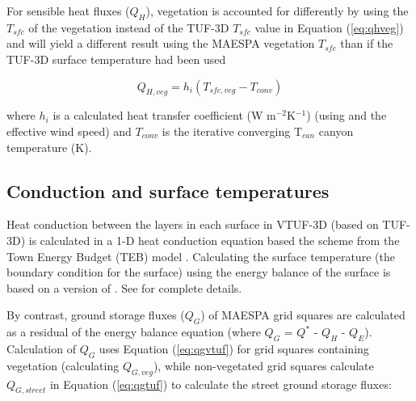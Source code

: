 \documentclass[final,3p,times,authoryear]{elsarticle}
\begin{document}

For sensible heat fluxes ($Q_{H}$), vegetation is accounted for differently by using the $T_{sfc}$ of the vegetation instead of the TUF-3D $T_{sfc}$ value in Equation (\ref{eq:qhveg}) and will yield a different result using the MAESPA vegetation $T_{sfc}$ than if the TUF-3D surface temperature had been used

\begin{equation}\label{eq:qhveg}
 Q_{H,veg} = h_{i}  (T_{sfc,veg}-T_{conv}) 
\end{equation}

where $h_{i}$ is a calculated heat transfer coefficient (W m$^{-2}$K$^{-1}$) (using \cite{Mascart1995} and the effective wind speed) and $T_{conv}$ is the iterative converging T$_{can}$ canyon temperature (K).


\subsection{Conduction and surface temperatures}

Heat conduction between the layers in each surface in VTUF-3D (based on TUF-3D) is calculated in a 1-D heat conduction equation based the scheme from the Town Energy Budget (TEB) model \citep{Masson2000}. Calculating the surface temperature (the boundary condition for the surface) using the energy balance of the surface is based on a version of \cite{Arnfield1990}. See \cite{Krayenhoff2007} for complete details.


By contrast, ground storage fluxes ($Q_{G}$) of MAESPA grid squares are calculated as a residual of the energy balance equation (where $Q_{G}$ = $Q^{*}$ - $Q_{H}$ - $Q_{E}$). Calculation of $Q_{G}$ uses Equation (\ref{eq:qgvtuf}) for grid squares containing vegetation (calculating $Q_{G,veg}$), while non-vegetated grid squares calculate $Q_{G,street}$ in Equation (\ref{eq:qgtuf}) to calculate the street ground storage fluxes:
\end{document}
